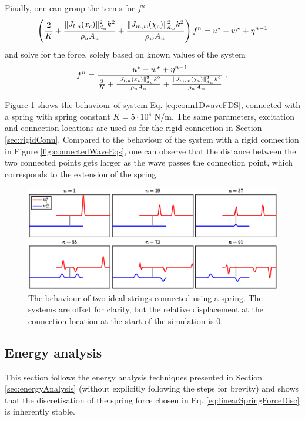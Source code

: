 Finally, one can group the terms for $f^n$ 
\begin{equation*}
    \left(\frac{2}{K} + \frac{\lVert J_{l, u}(x_{\text{c}})\rVert_{d_u}^2k^2}{\rho_u A_u} +  \frac{\lVert J_{m, w}(\chi_{\text{c}})\rVert_{d_w}^2k^2}{\rho_w A_w}\right)f^n = u^\star - w^\star + \eta^{n-1}
\end{equation*}
and solve for the force, solely based on known values of the system
\begin{equation}
    f^n = \frac{u^\star - w^\star + \eta^{n-1}}{\frac{2}{K} + \frac{\lVert J_{l, u}(x_{\text{c}})\rVert_{d_u}^2k^2}{\rho_u A_u} +  \frac{\lVert J_{m, w}(\chi_{\text{c}})\rVert_{d_w}^2k^2}{\rho_w A_w}}\ .
\end{equation}

Figure \ref{fig:connectedWaveEqsSpring} shows the behaviour of system Eq. \eqref{eq:conn1DwaveFDS}, connected with a spring with spring constant $K = 5\cdot 10^4$ N/m. The same parameters, excitation and connection locations are used as for the rigid connection in Section \ref{sec:rigidConn}. Compared to the behaviour of the system with a rigid connection in Figure \ref{fig:connectedWaveEqs}, one can observe that the distance between the two connected points gets larger as the wave passes the connection point, which corresponds to the extension of the spring. 

\begin{figure}[h]
    \centering
    \includegraphics[width=\textwidth]{figures/interactions/connectedWaveEqsSpring.eps}
    \caption{The behaviour of two ideal strings connected using a spring. The systems are offset for clarity, but the relative displacement at the connection location at the start of the simulation is 0. \label{fig:connectedWaveEqsSpring}}
\end{figure}

\subsection{Energy analysis}\label{sec:conn1DwaveEnergySpring}
This section follows the energy analysis techniques presented in Section \ref{sec:energyAnalysis} (without explicitly following the steps for brevity) and shows that the discretisation of the spring force chosen in Eq. \eqref{eq:linearSpringForceDisc} is inherently stable. 

